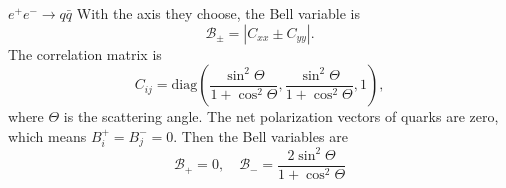 \documentclass{beamer}
\begin{document}
    \begin{frame}{$e^+e^-\to q\bar{q}$ \footnotesize {}}
        With the axis they choose, the Bell variable is 
        \begin{equation*}
            \mathcal{B}_{\pm}=\left|C_{xx}\pm C_{yy}\right|.
        \end{equation*}
        The correlation matrix is 
        \begin{equation*}
            C_{ij} = \text{diag}\left(\frac{\sin^2\Theta}{1+\cos^2\Theta}, \frac{\sin^2\Theta}{1+\cos^2\Theta}, 1\right),
        \end{equation*}
        where $\Theta$ is the scattering angle. 
        The net polarization vectors of quarks are zero, which means $B_i^+=B_j^-=0$. 
        Then the Bell variables are 
        \begin{equation*}
            \mathcal{B}_+ = 0, \quad \mathcal{B}_- = \frac{2\sin^2\Theta}{1+\cos^2\Theta}
        \end{equation*}
    \end{frame}
\end{document}
